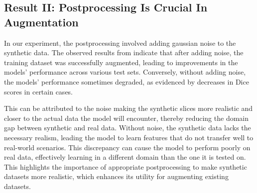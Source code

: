 \documentclass[preprint,12pt]{elsarticle}
\begin{document}
\subsection{Result II: Postprocessing Is Crucial In Augmentation}
In our experiment, the postprocessing involved adding gaussian noise to the synthetic data. 
The observed results from  indicate that after adding noise, the training dataset was successfully augmented, leading to improvements in the models' performance across various test sets. 
Conversely, without adding noise, the models' performance sometimes degraded, as evidenced by decreases in Dice scores in certain cases.

This can be attributed to the noise making the synthetic slices more realistic and closer to the actual data the model will encounter, thereby reducing the domain gap between synthetic and real data.
Without noise, the synthetic data lacks the necessary realism, leading the model to learn features that do not transfer well to real-world scenarios.
This discrepancy can cause the model to perform poorly on real data, effectively learning in a different domain than the one it is tested on. This highlights the importance of appropriate postprocessing to make synthetic datasets more realistic, which enhances its utility for augmenting existing datasets.
\end{document}
